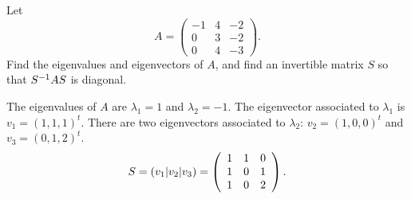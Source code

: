 \documentclass{ximera}
\begin{document}
\begin{exercise} \label{c10.3.3}
Let
\[
A=\left(\begin{array}{rrr} -1 & 4 & -2 \\ 0 & 3 & -2 \\ 0 & 4 & -3 \end{array}
\right).
\]
Find the eigenvalues and eigenvectors of $A$, and find an invertible  
matrix $S$ so that $S^{-1} AS$ is diagonal.

\begin{solution}

\soln
The eigenvalues of $A$ are $\lambda_1 = 1$ and $\lambda_2 = -1$.  The
eigenvector associated to $\lambda_1$ is $v_1 = (1,1,1)^t$.  There are
two eigenvectors associated to $\lambda_2$: $v_2 = (1,0,0)^t$ and
$v_3 = (0,1,2)^t$.
\[
S = (v_1|v_2|v_3) = \left(\begin{array}{rrr} 1 & 1 & 0 \\ 1 & 0 & 1 \\ 1 & 0 & 2\end{array}\right).
\]

\end{solution}
\end{exercise}
\end{document}
